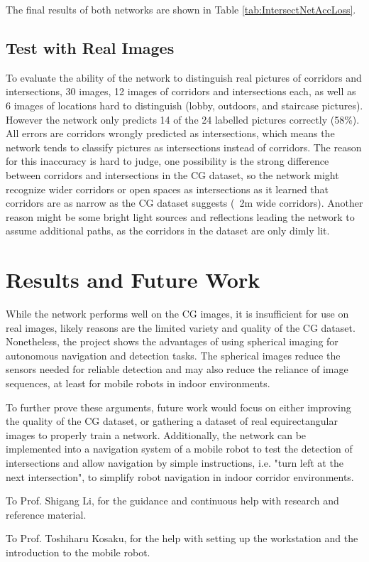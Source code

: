 \documentclass[sigconf]{acmart}
\begin{document}
The final results of both networks are shown in Table \ref{tab:IntersectNetAccLoss}.

\subsection{Test with Real Images}
To evaluate the ability of the network to distinguish real pictures of corridors and intersections, 30 images, 12 images of corridors and intersections each, as well as 6 images of locations hard to distinguish (lobby, outdoors, and staircase pictures).
However the network only predicts 14 of the 24 labelled pictures correctly (58\%).
All errors are corridors wrongly predicted as intersections, which means the network tends to classify pictures as intersections instead of corridors.
The reason for this inaccuracy is hard to judge, one possibility is the strong difference between corridors and intersections in the CG dataset, so the network might recognize wider corridors or open spaces as intersections as it learned that corridors are as narrow as the CG dataset suggests (~2m wide corridors).
Another reason might be some bright light sources and reflections leading the network to assume additional paths, as the corridors in the dataset are only dimly lit.

\section{Results and Future Work}
While the network performs well on the CG images, it is insufficient for use on real images, likely reasons are the limited variety and quality of the CG dataset.
Nonetheless, the project shows the advantages of using spherical imaging for autonomous navigation and detection tasks.
The spherical images reduce the sensors needed for reliable detection and may also reduce the reliance of image sequences, at least for mobile robots in indoor environments.

To further prove these arguments, future work would focus on either improving the quality of the CG dataset, or gathering a dataset of real equirectangular images to properly train a network.
Additionally, the network can be implemented into a navigation system of a mobile robot to test the detection of intersections and allow navigation by simple instructions, i.e. "turn left at the next intersection", to simplify robot navigation in indoor corridor environments.

\begin{acks}
To Prof. Shigang Li, for the guidance and continuous help with research and reference material.

To Prof. Toshiharu Kosaku, for the help with setting up the workstation and the introduction to the mobile robot.
\end{acks}
\end{document}
